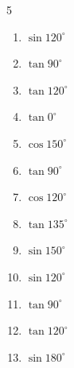 \begin{multicols}{5}
\begin{enumerate}
  \item $\displaystyle \sin{120^\circ}$


  \item $\displaystyle \tan{90^\circ}$

        \phantom{$\displaystyle なし$}

  \item $\displaystyle \tan{120^\circ}$


  \item $\displaystyle \tan{0^\circ}$

        \phantom{$\displaystyle =0$}

  \item $\displaystyle \cos{150^\circ}$


\columnbreak %

  \item $\displaystyle \tan{90^\circ}$

        \phantom{$\displaystyle なし$}

  \item $\displaystyle \cos{120^\circ}$


  \item $\displaystyle \tan{135^\circ}$

        \phantom{$\displaystyle =-1$}

  \item $\displaystyle \sin{150^\circ}$


  \item $\displaystyle \sin{120^\circ}$


  \item $\displaystyle \tan{90^\circ}$

        \phantom{$\displaystyle なし$}

  \item $\displaystyle \tan{120^\circ}$


  \item $\displaystyle \sin{180^\circ}$


\end{enumerate}
\end{multicols}
